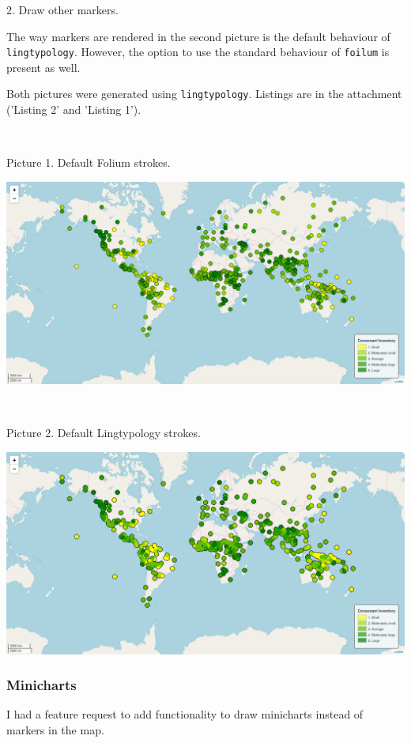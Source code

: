 \documentclass[a4paper,12pt]{article}
\begin{document}
2. Draw other markers.

The way markers are rendered in the second picture is the default behaviour of \texttt{lingtypology}. However, the option to use the standard behaviour of \texttt{foilum} is present as well.

Both pictures were generated using \texttt{lingtypology}. Listings are in the attachment ('Listing 2' and 'Listing 1').

~\linebreak

Picture 1. Default Folium strokes.
\nopagebreak

\includegraphics[width=\textwidth]{images/FoliumStrokeAppearance.png}

~\linebreak

Picture 2. Default Lingtypology strokes.
\nopagebreak

\includegraphics[width=\textwidth]{images/LingtypologyStrokeAppearance.png}

\subsubsection{Minicharts}

I had a feature request to add functionality to draw minicharts instead of markers in the map.
\end{document}

